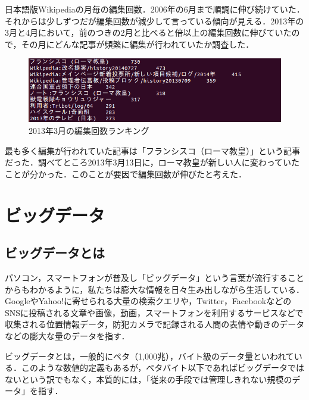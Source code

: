日本語版Wikipediaの月毎の編集回数．2006年の6月まで順調に伸び続けていた．それからは少しずつだが編集回数が減少して言っている傾向が見える．2013年の3月と4月において，前のつきの2月と比べると倍以上の編集回数に伸びていたので，その月にどんな記事が頻繁に編集が行われていたか調査した．

\begin{figure}[H]
\centering
\includegraphics[width=12cm]{revision2013_03.png}
\caption{2013年3月の編集回数ランキング}\label{サンプル図}
\end{figure}

最も多く編集が行われていた記事は「フランシスコ（ローマ教皇）」という記事だった．調べてところ2013年3月13日に，ローマ教皇が新しい人に変わっていたことが分かった．このことが要因で編集回数が伸びたと考えた．



\chapter{ビッグデータ}

\section{ビッグデータとは}

パソコン，スマートフォンが普及し「ビッグデータ」という言葉が流行することからもわかるように，私たちは膨大な情報を日々生み出しながら生活している．GoogleやYahoo!に寄せられる大量の検索クエリや，Twitter，FacebookなどのSNSに投稿される文章や画像，動画，スマートフォンを利用するサービスなどで収集される位置情報データ，防犯カメラで記録される人間の表情や動きのデータなどの膨大な量のデータを指す．

ビッグデータとは，一般的にペタ（1,000兆），バイト級のデータ量といわれている．このような数値的定義もあるが，ペタバイト以下であればビッグデータではないという訳でもなく，本質的には，「従来の手段では管理しきれない規模のデータ」を指す．

